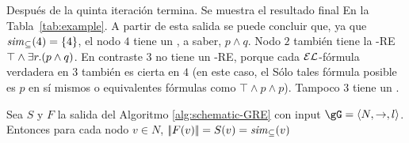 \begin{ex}
Despu\'es de la quinta iteraci\'on termina. Se muestra el resultado final
En la Tabla~\ref{tab:example}. A partir de esta salida se puede concluir que,
ya que${\it sim}_\subseteq(4)=\{4\}$, el nodo $4$ tiene un \posre, a saber,
$p\wedge q$. Nodo $2$ tambi\'en tiene la \EL-RE $\top\wedge\exists r.(p\wedge
q)$. En contraste $3$ no tiene un \EL-RE, porque cada
$\mathcal{EL}$-f\'ormula verdadera en $3$ tambi\'en es cierta en $4$ (en este caso, el
S\'olo tales f\'ormula posible es $p$ en s\'i mismos o equivalentes
f\'ormulas como $\top\wedge p\wedge p$). Tampoco $3$ tiene un \posre.

\end{ex}
\fi

\iffullversion
\begin{theorem}\label{thm:correctness-schematic-GRE}
Sea $S$ y $F$ la salida del Algoritmo
\ref{alg:schematic-GRE} con input $\gG=\tup{N,\to,l}$. Entonces para cada
nodo $v\in N$, $|\!|F(v)|\!| = S(v) = {\it sim}_\subseteq(v)$
\end{theorem}
\fi


